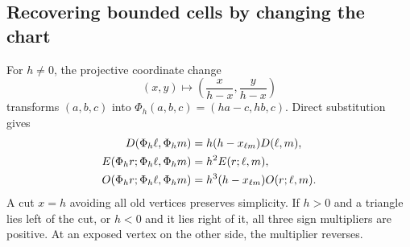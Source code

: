 \subsection{Recovering bounded cells by changing the chart}

For $h\ne0$, the projective coordinate change
\[
 (x,y)\longmapsto\left(\frac{x}{h-x},\frac{y}{h-x}\right)
\]
transforms $(a,b,c)$ into $\Phi_h(a,b,c)=(ha-c,hb,c)$. Direct substitution gives
\begin{align}
 D(\Phi_h\ell,\Phi_hm)&=h(h-x_{\ell m})D(\ell,m),\notag\\
 E(\Phi_hr;\Phi_h\ell,\Phi_hm)&=h^2E(r;\ell,m),\notag\\
 O(\Phi_hr;\Phi_h\ell,\Phi_hm)&=h^3(h-x_{\ell m})O(r;\ell,m).\label{j:covariance}
\end{align}
A cut $x=h$ avoiding all old vertices preserves simplicity. If $h>0$ and a triangle lies left of the cut, or $h<0$ and it lies right of it, all three sign multipliers are positive. At an exposed vertex on the other side, the multiplier reverses.

